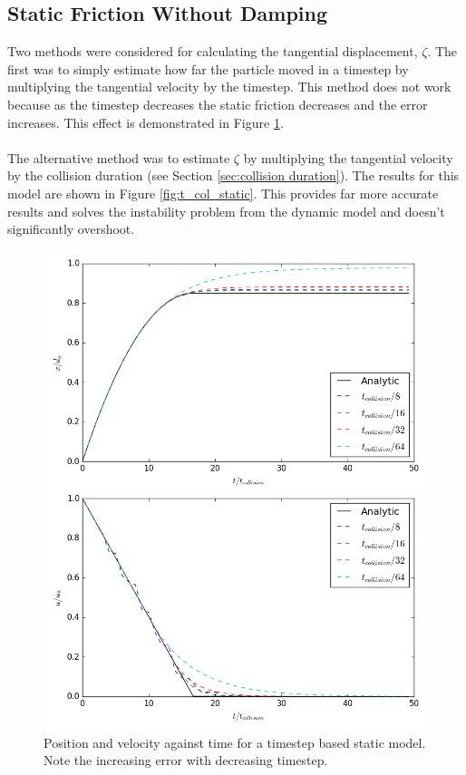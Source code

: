 \documentclass[a4paper,11pt,titlepage]{report}
\begin{document}
\subsection{Static Friction Without Damping}
Two methods were considered for calculating the tangential displacement, $\zeta$. The first was to simply estimate how far the particle moved in a timestep by multiplying the tangential velocity by the timestep. This method does not work because as the timestep decreases the static friction decreases and the error increases. This effect is demonstrated in Figure \ref{fig:delta_t_static}.
\\\\The alternative method was to estimate $\zeta$ by multiplying the tangential velocity by the collision duration (see Section \ref{sec:collision duration}). The results for this model are shown in Figure \ref{fig:t_col_static}. This provides far more accurate results and solves the instability problem from the dynamic model and doesn't significantly overshoot.
\begin{figure}[!ht]
\centering
\includegraphics[scale=0.5]{figures/friction_model/delta_t_static.png}
\caption{Position and velocity against time for a timestep based static model. Note the increasing error with decreasing timestep.}
\label{fig:delta_t_static}
\end{figure}
\end{document}
